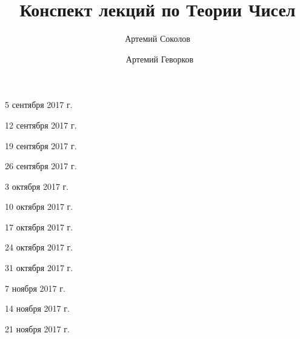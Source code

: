 \documentclass[%
  a4paper,%
  titlepage,%
  11pt%
]{article}%
\title{Конспект лекций по Теории Чисел}
\author{Артемий Соколов \and~Артемий Геворков}
\begin{document}
    
    
    \tableofcontents

    \pagestyle{fancy}

    \begin{lecture}{5 сентября 2017 г.}
        
    \end{lecture}

    \begin{lecture}{12 сентября 2017 г.}
        
    \end{lecture}

    \begin{lecture}{19 сентября 2017 г.}
        
    \end{lecture}

    \begin{lecture}{26 сентября 2017 г.}
        
    \end{lecture}

    \begin{lecture}{3 октября 2017 г.}
        
    \end{lecture}

    \begin{lecture}{10 октября 2017 г.}
        
    \end{lecture}

    \begin{lecture}{17 октября 2017 г.}
        
    \end{lecture}

    \begin{lecture}{24 октября 2017 г.}
        
    \end{lecture}

    \begin{lecture}{31 октября 2017 г.}
        
    \end{lecture}

    \begin{lecture}{7 ноября 2017 г.}
        
    \end{lecture}

    \begin{lecture}{14 ноября 2017 г.}
        
    \end{lecture}

    \begin{lecture}{21 ноября 2017 г.}
        
    \end{lecture}
\end{document}
